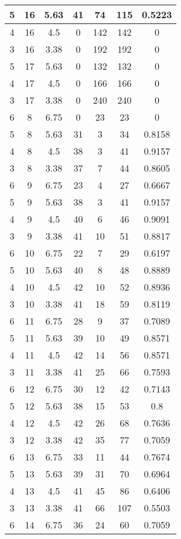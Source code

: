 \documentclass[letterpaper, 12pt]{article}
\begin{document}
\begin{longtable}{|c|c|c|c|c|c|c|}
\hline
5 & 16 & 5.63 & 41 & 74 & 115 & 0.5223 \\
\hline
4 & 16 & 4.5 & 0 & 142 & 142 & 0 \\
\hline
3 & 16 & 3.38 & 0 & 192 & 192 & 0 \\
\hline
5 & 17 & 5.63 & 0 & 132 & 132 & 0 \\
\hline
4 & 17 & 4.5 & 0 & 166 & 166 & 0 \\
\hline
3 & 17 & 3.38 & 0 & 240 & 240 & 0 \\
\hline
6 & 8 & 6.75 & 0 & 23 & 23 & 0 \\
\hline
5 & 8 & 5.63 & 31 & 3 & 34 & 0.8158 \\
\hline
4 & 8 & 4.5 & 38 & 3 & 41 & 0.9157 \\
\hline
3 & 8 & 3.38 & 37 & 7 & 44 & 0.8605 \\
\hline
6 & 9 & 6.75 & 23 & 4 & 27 & 0.6667 \\
\hline
5 & 9 & 5.63 & 38 & 3 & 41 & 0.9157 \\
\hline
4 & 9 & 4.5 & 40 & 6 & 46 & 0.9091 \\
\hline
3 & 9 & 3.38 & 41 & 10 & 51 & 0.8817 \\
\hline
6 & 10 & 6.75 & 22 & 7 & 29 & 0.6197 \\
\hline
5 & 10 & 5.63 & 40 & 8 & 48 & 0.8889 \\
\hline
4 & 10 & 4.5 & 42 & 10 & 52 & 0.8936 \\
\hline
3 & 10 & 3.38 & 41 & 18 & 59 & 0.8119 \\
\hline
6 & 11 & 6.75 & 28 & 9 & 37 & 0.7089 \\
\hline
5 & 11 & 5.63 & 39 & 10 & 49 & 0.8571 \\
\hline
4 & 11 & 4.5 & 42 & 14 & 56 & 0.8571 \\
\hline
3 & 11 & 3.38 & 41 & 25 & 66 & 0.7593 \\
\hline
6 & 12 & 6.75 & 30 & 12 & 42 & 0.7143 \\
\hline
5 & 12 & 5.63 & 38 & 15 & 53 & 0.8 \\
\hline
4 & 12 & 4.5 & 42 & 26 & 68 & 0.7636 \\
\hline
3 & 12 & 3.38 & 42 & 35 & 77 & 0.7059 \\
\hline
6 & 13 & 6.75 & 33 & 11 & 44 & 0.7674 \\
\hline
5 & 13 & 5.63 & 39 & 31 & 70 & 0.6964 \\
\hline
4 & 13 & 4.5 & 41 & 45 & 86 & 0.6406 \\
\hline
3 & 13 & 3.38 & 41 & 66 & 107 & 0.5503 \\
\hline
6 & 14 & 6.75 & 36 & 24 & 60 & 0.7059 \\

\end{longtable}
\end{document}
